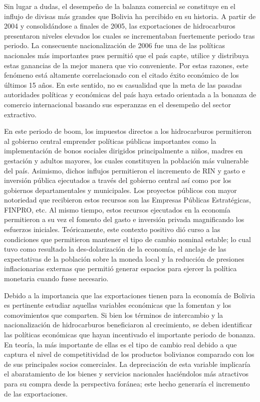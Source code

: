 \documentclass[12pt,letterpaper]{article}
\begin{document}
Sin lugar a dudas, el desempeño de la balanza comercial se constituye en el influjo de divisas más grandes que Bolivia ha percibido en su historia. A partir de 2004 y consolidándose a finales de 2005, las exportaciones de hidrocarburos presentaron niveles elevados los cuales se incrementaban fuertemente periodo tras periodo. La consecuente nacionalización de 2006 fue una de las políticas nacionales más importantes pues permitió que el país capte, utilice y distribuya estas ganancias de la mejor manera que vio conveniente. Por estas razones, este fenómeno está altamente correlacionado con el citado éxito económico de los últimos 15 años. En este sentido, no es casualidad que la meta de las pasadas autoridades políticas y económicas del país haya estado orientada a la bonanza de comercio internacional basando sus esperanzas en el desempeño del sector extractivo.

En este periodo de boom, los impuestos directos a los hidrocarburos permitieron al gobierno central emprender políticas públicas importantes como la implementación de bonos sociales dirigidos principalmente a niños, madres en gestación y adultos mayores, los cuales constituyen la población más vulnerable del país. Asimismo, dichos influjos permitieron el incremento de RIN y gasto e inversión pública ejecutados a través del gobierno central así como por los gobiernos departamentales y municipales. Los proyectos públicos con mayor notoriedad que recibieron estos recursos son las Empresas Públicas Estratégicas, FINPRO, etc. Al mismo tiempo, estos recursos ejecutados en la economía permitieron a su vez el fomento del gasto e inversión privada magnificando los esfuerzos iniciales. Teóricamente, este contexto positivo dió curso a las condiciones que permitieron mantener el tipo de cambio nominal estable; lo cual tuvo como resultado la des-dolarización de la economía, el anclaje de las expectativas de la población sobre la moneda local y la reducción de presiones inflacionarias externas que permitió generar espacios para ejercer la política monetaria cuando fuese necesario. 

Debido a la importancia que las exportaciones tienen para la economía de Bolivia es pertinente estudiar aquellas variables económicas que la fomentan y los comovimientos que comparten. Si bien los términos de intercambio y la nacionalización de hidrocarburos beneficiaron al crecimiento, se deben identificar las políticas económicas que hayan incentivado el importante periodo de bonanza. En teoría, la más importante de ellas es el tipo de cambio real debido a que captura el nivel de competitividad de los productos bolivianos comparado con los de sus principales socios comerciales. La depreciación de esta variable implicaría el abaratamiento de los bienes y servicios nacionales haciéndolos más atractivos para su compra desde la perspectiva foránea; este hecho generaría el incremento de las exportaciones.
\end{document}
